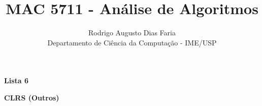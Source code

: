 \documentclass[12pt]{article}
\begin{document}
 
\title{MAC 5711 - Análise de Algoritmos}
\author{Rodrigo Augusto Dias Faria\\
Departamento de Ciência da Computação - IME/USP}
 
\maketitle

\begin{comment}
\begin{center} 
\textbf{\large{Lista 1}}
\end{center}




\clearpage
\begin{center} 
\textbf{\large{Lista 2}}
\end{center}



\clearpage
\begin{center} 
\textbf{\large{Lista 3}}
\end{center}





\clearpage

\begin{center} 
\textbf{\large{Lista 4}}
\end{center}






\clearpage

\begin{center} 
\textbf{\large{Lista 5}}
\end{center}
\end{comment}
















\clearpage

\begin{center} 
\textbf{\large{Lista 6}}
\end{center}











\clearpage

\begin{center} 
\textbf{\large{CLRS (Outros)}}
\end{center}


\end{document}
